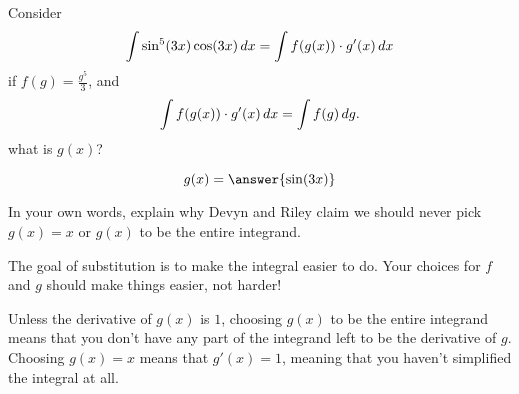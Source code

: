 \documentclass{ximera}
\begin{document}
\begin{problem}
  Consider
  \[
  \int \sin^5(3x) \cos(3x) \,d x = \int f(g(x)) \cdot g'(x) \,d x
  \]
  if $f(g) = \frac{g^5}{3}$, and 
  \[
  \int f(g(x)) \cdot g'(x) \,d x = \int f(g) \,d g.
  \]
  what is $g(x)$?
  \begin{prompt}
    \[
    g(x) = \answer{\sin(3 x)}
    \]
  \end{prompt}
\end{problem}

\begin{problem}
	In your own words, explain why Devyn and Riley claim we should never 
	pick $g(x) = x$ or $g(x)$ to be the entire integrand.
	\begin{freeResponse}
		The goal of substitution is to make the integral easier to do.  Your choices
		for $f$ and $g$ should make things easier, not harder!
	
		Unless the derivative of $g(x)$ is $1$, choosing $g(x)$ to be the entire
		integrand means that you don't have any part of the integrand left to be
		the derivative of $g$.  Choosing $g(x) = x$ means that $g'(x) = 1$, meaning
		that you haven't simplified the integral at all.  
	\end{freeResponse}
\end{problem}


\end{document}
